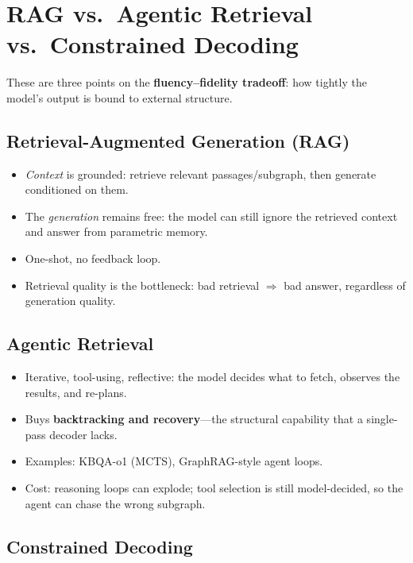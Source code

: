 \documentclass[11pt,a4paper]{article}
\begin{document}
\section{RAG vs.\ Agentic Retrieval vs.\ Constrained Decoding}

These are three points on the \textbf{fluency--fidelity tradeoff}:
how tightly the model's output is bound to external structure.

\subsection{Retrieval-Augmented Generation (RAG)}

\begin{itemize}
  \item \emph{Context} is grounded: retrieve relevant passages/subgraph,
    then generate conditioned on them.
  \item The \emph{generation} remains free: the model can still ignore
    the retrieved context and answer from parametric memory.
  \item One-shot, no feedback loop.
  \item Retrieval quality is the bottleneck: bad retrieval $\Rightarrow$
    bad answer, regardless of generation quality.
\end{itemize}

\subsection{Agentic Retrieval}

\begin{itemize}
  \item Iterative, tool-using, reflective: the model decides what to
    fetch, observes the results, and re-plans.
  \item Buys \textbf{backtracking and recovery}---the structural
    capability that a single-pass decoder lacks.
  \item Examples: KBQA-o1 (MCTS), GraphRAG-style agent loops.
  \item Cost: reasoning loops can explode; tool selection is still
    model-decided, so the agent can chase the wrong subgraph.
\end{itemize}

\subsection{Constrained Decoding}
\end{document}
